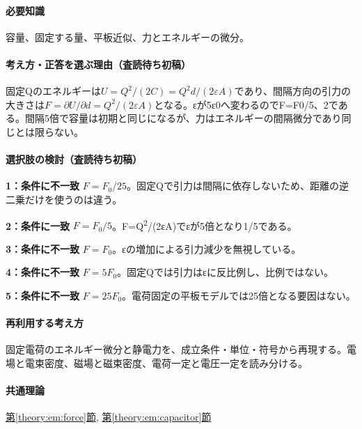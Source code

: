 \paragraph{必要知識} 容量、固定する量、平板近似、力とエネルギーの微分。

\paragraph{考え方・正答を選ぶ理由（査読待ち初稿）} 固定Qのエネルギーは\(U=Q^2/(2C)=Q^2d/(2\varepsilon A)\)であり、間隔方向の引力の大きさは\(F=\partial U/\partial d=Q^2/(2\varepsilon A)\)となる。εが5ε0へ変わるのでF=\allowbreak{}F0/5、2である。間隔5倍で容量は初期と同じになるが、力はエネルギーの間隔微分であり同じとは限らない。

\paragraph{選択肢の検討（査読待ち初稿）}\mbox{}\par

\noindent\textbf{1：条件に不一致} \(F=F_0/25\)。固定Qで引力は間隔に依存しないため、距離の逆二乗だけを使うのは違う。\par

\noindent\textbf{2：条件に一致} \(F=F_0/5\)。F=\allowbreak{}Q\textsuperscript{2}/(2εA)でεが5倍となり1/5である。\par

\noindent\textbf{3：条件に不一致} \(F=F_0\)。εの増加による引力減少を無視している。\par

\noindent\textbf{4：条件に不一致} \(F=5F_0\)。固定Qでは引力はεに反比例し、比例ではない。\par

\noindent\textbf{5：条件に不一致} \(F=25F_0\)。電荷固定の平板モデルでは25倍となる要因はない。\par

\paragraph{再利用する考え方} 固定電荷のエネルギー微分と静電力を、成立条件・単位・符号から再現する。電場と電束密度、磁場と磁束密度、電荷一定と電圧一定を読み分ける。

\paragraph{共通理論} \hyperref[theory:em:force]{第\ref*{theory:em:force}節}, \hyperref[theory:em:capacitor]{第\ref*{theory:em:capacitor}節}

